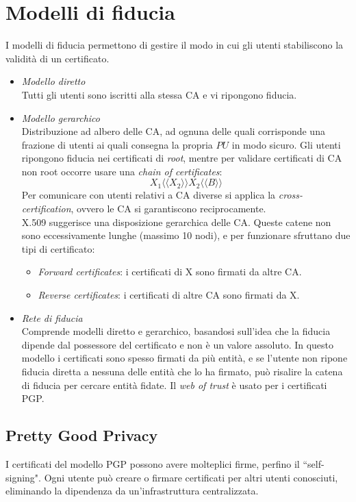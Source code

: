 \documentclass[a4paper, 11pt, notitlepage, fleqn]{report}
\newcommand{\llangle}{\langle\!\langle}
\newcommand{\rrangle}{\rangle\!\rangle}
\begin{document}
\section{Modelli di fiducia}
I modelli di fiducia permettono di gestire il modo in cui gli utenti stabiliscono la validità di un certificato.
\begin{itemize}
	\item \emph{Modello diretto}\\
	Tutti gli utenti sono iscritti alla stessa CA e vi ripongono fiducia.
	\item \emph{Modello gerarchico}\\
	Distribuzione ad albero delle CA, ad ognuna delle quali corrisponde una frazione di utenti ai quali consegna la propria $PU$ in modo sicuro.
	Gli utenti ripongono fiducia nei certificati di \emph{root}, mentre per validare certificati di CA non root occorre usare una \emph{chain of certificates}:
	\begin{equation*}
		X_1\llangle X_2\rrangle X_2 \llangle B \rrangle
	\end{equation*}
	Per comunicare con utenti relativi a CA diverse si applica la \emph{cross-certification}, ovvero le CA si garantiscono reciprocamente.\\
	X.509 suggerisce una disposizione gerarchica delle CA. Queste catene non sono eccessivamente lunghe (massimo 10 nodi), e per funzionare sfruttano due tipi di certificato: 
	\begin{itemize}
		\item \emph{Forward certificates}: i certificati di X sono firmati da altre CA.
		\item \emph{Reverse certificates}: i certificati di altre CA sono firmati da X.
	\end{itemize}
	\item \emph{Rete di fiducia}\\
	Comprende modelli diretto e gerarchico, basandosi sull'idea che la fiducia dipende dal possessore del certificato e non è un valore assoluto. In questo modello i certificati sono spesso firmati da più entità, e se l'utente non ripone fiducia diretta a nessuna delle entità che lo ha firmato, può risalire la catena di fiducia per cercare entità fidate. Il \emph{web of trust} è usato per i certificati PGP.
\end{itemize}

\subsection{Pretty Good Privacy}
I certificati del modello PGP possono avere molteplici firme, perfino il ``self-signing". Ogni utente può creare o firmare certificati per altri utenti conosciuti, eliminando la dipendenza da un'infrastruttura centralizzata.
\end{document}
